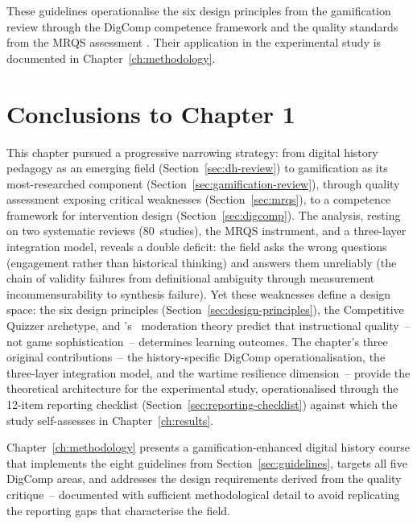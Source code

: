These guidelines operationalise the six design principles from the gamification review \citep{KorniienkoSemerikov2024} through the DigComp competence framework and the quality standards from the MRQS assessment \citep{Korniienko2025mrqs}. Their application in the experimental study is documented in Chapter~\ref{ch:methodology}.



\section{Conclusions to Chapter 1} \label{sec:ch1-conclusions}

This chapter pursued a progressive narrowing strategy: from digital history pedagogy as an emerging field (Section~\ref{sec:dh-review}) to gamification as its most-researched component (Section~\ref{sec:gamification-review}), through quality assessment exposing critical weaknesses (Section~\ref{sec:mrqs}), to a competence framework for intervention design (Section~\ref{sec:digcomp}). The analysis, resting on two systematic reviews (80~studies), the MRQS instrument, and a three-layer integration model, reveals a double deficit: the field asks the wrong questions (engagement rather than historical thinking) and answers them unreliably (the chain of validity failures from definitional ambiguity through measurement incommensurability to synthesis failure). Yet these weaknesses define a design space: the six design principles (Section~\ref{sec:design-principles}), the Competitive Quizzer archetype, and \citeauthor{Landers2014}'s~\cite{Landers2014} moderation theory predict that instructional quality~-- not game sophistication~-- determines learning outcomes. The chapter's three original contributions~-- the history-specific DigComp operationalisation, the three-layer integration model, and the wartime resilience dimension~-- provide the theoretical architecture for the experimental study, operationalised through the 12-item reporting checklist (Section~\ref{sec:reporting-checklist}) against which the study self-assesses in Chapter~\ref{ch:results}.

Chapter~\ref{ch:methodology} presents a gamification-enhanced digital history course that implements the eight guidelines from Section~\ref{sec:guidelines}, targets all five DigComp areas, and addresses the design requirements derived from the quality critique~-- documented with sufficient methodological detail to avoid replicating the reporting gaps that characterise the field.
